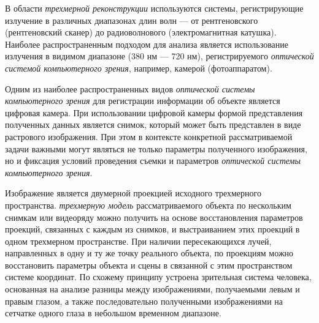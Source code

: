 В области \textit{трехмерной реконструкции} используются системы, регистрирующие излучение в различных диапазонах длин волн --- от рентгеновского (рентгеновский сканер) до радиоволнового (электромагнитная катушка). Наиболее распространенным подходом для анализа является использование излучения в видимом диапазоне (380 нм --- 720 нм), регистрируемого \textit{оптической системой компьютерного зрения}, например, камерой (фотоаппаратом). 

\begin{SCn}
\end{SCn}

Одним из наиболее распространенных видов \textit{оптической системы компьютерного зрения} для регистрации информации об объекте является цифровая камера. При использовании цифровой камеры формой представления полученных данных является снимок, который может быть представлен в виде растрового изображения. При этом в контексте конкретной рассматриваемой задачи важными могут являться не только параметры полученного изображения, но и фиксация условий проведения съемки и параметров \textit{оптической системы компьютерного зрения}.  

Изображение является двумерной проекцией исходного трехмерного пространства. \textit{трехмерную модель} рассматриваемого объекта по нескольким снимкам или видеоряду можно получить на основе восстановления параметров проекций, связанных с каждым из снимков, и выстраиванием этих проекций в одном трехмерном пространстве. При наличии пересекающихся лучей, направленных в одну и ту же точку реального объекта, по проекциям можно восстановить параметры объекта и сцены в связанной с этим пространством системе координат. По схожему принципу устроена зрительная система человека, основанная на анализе разницы между изображениями, получаемыми левым и правым глазом, а также последовательно полученными изображениями на сетчатке одного глаза в небольшом временном диапазоне.

\begin{SCn}
\end{SCn}

\begin{SCn}
\end{SCn}

